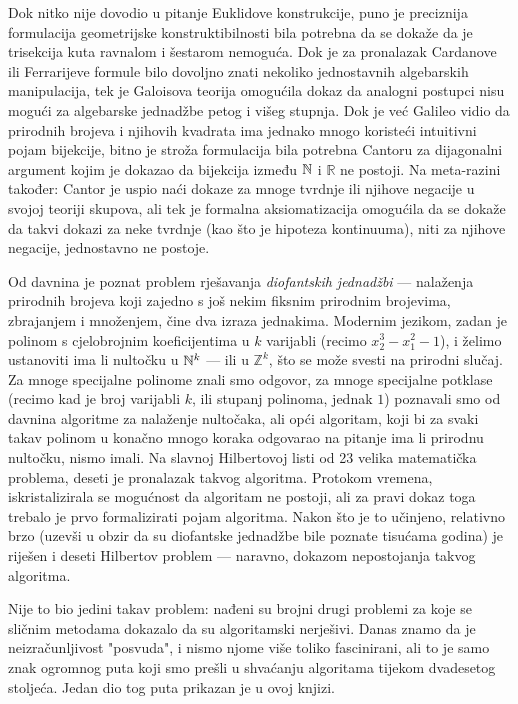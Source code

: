 Dok nitko nije dovodio u pitanje Euklidove konstrukcije, puno je preciznija formulacija geometrijske konstruktibilnosti bila potrebna da se dokaže da je trisekcija kuta ravnalom i šestarom nemoguća. Dok je za pronalazak Cardanove ili Ferrarijeve formule bilo dovoljno znati nekoliko jednostavnih algebarskih manipulacija, tek je Galoisova teorija omogućila dokaz da analogni postupci nisu mogući za algebarske jednadžbe petog i višeg stupnja. Dok je već Galileo vidio da prirodnih brojeva i njihovih kvadrata ima jednako mnogo koristeći intuitivni pojam bijekcije, bitno je stroža formulacija bila potrebna Cantoru za dijagonalni argument kojim je dokazao da bijekcija između ${\mathbb N}$ i $\mathbb R$ ne postoji. Na meta-razini također: Cantor je uspio naći dokaze za mnoge tvrdnje ili njihove negacije u svojoj teoriji skupova, ali tek je formalna aksiomatizacija omogućila da se dokaže da takvi dokazi za neke tvrdnje (kao što je hipoteza kontinuuma), niti za njihove negacije, jednostavno ne postoje.

Od davnina je poznat problem rješavanja \emph{diofantskih jednadžbi} --- nalaženja prirodnih brojeva koji zajedno s još nekim fiksnim prirodnim brojevima, zbrajanjem i množenjem, čine dva izraza jednakima. Modernim jezikom, zadan je polinom s cjelobrojnim koeficijentima u $k$ varijabli (recimo $x_2^3-x_1^2-1$), i želimo ustanoviti ima li nultočku u ${\mathbb N}^k$ --- ili u $\mathbb Z^k$, što se može svesti na prirodni slučaj. Za mnoge specijalne polinome znali smo odgovor, za mnoge specijalne potklase (recimo kad je broj varijabli $k$, ili stupanj polinoma, jednak $1$) poznavali smo od davnina algoritme za nalaženje nultočaka, ali opći algoritam, koji bi za svaki takav polinom u konačno mnogo koraka odgovarao na pitanje ima li prirodnu nultočku, nismo imali. Na slavnoj Hilbertovoj listi od 23 velika matematička problema, deseti je pronalazak takvog algoritma. Protokom vremena, iskristalizirala se mogućnost da algoritam ne postoji, ali za pravi dokaz toga trebalo je prvo formalizirati pojam algoritma. Nakon što je to učinjeno, relativno brzo (uzevši u obzir da su diofantske jednadžbe bile poznate tisućama godina) je riješen i deseti Hilbertov problem --- naravno, dokazom nepostojanja takvog algoritma.

Nije to bio jedini takav problem: nađeni su brojni drugi problemi za koje se sličnim metodama dokazalo da su algoritamski nerješivi. Danas znamo da je neizračunljivost "posvuda", i nismo njome više toliko fascinirani, ali to je samo znak ogromnog puta koji smo prešli u shvaćanju algoritama tijekom dvadesetog stoljeća. Jedan dio tog puta prikazan je u ovoj knjizi.

